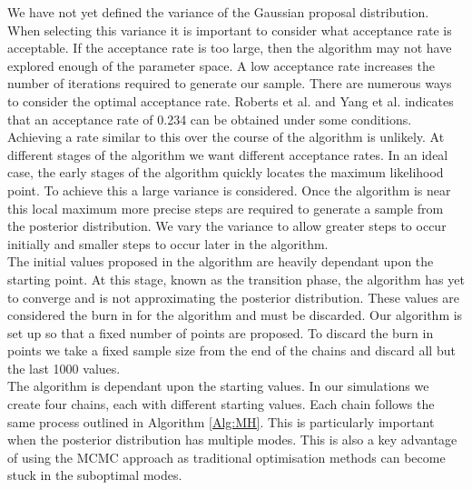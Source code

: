 We have not yet defined the variance of the Gaussian proposal distribution. When selecting this variance it is important to consider what acceptance rate is acceptable. If the acceptance rate is too large, then the algorithm may not have explored enough of the parameter space. A low acceptance rate increases the number of iterations required to generate our sample. There are numerous ways to consider the optimal acceptance rate. Roberts et al. \cite{Rob97} and Yang et al. \cite{Yang20}  indicates that an acceptance rate of 0.234 can be obtained under some conditions. Achieving a rate similar to this over the course of the algorithm is unlikely. At different stages of the algorithm we want different acceptance rates. In an ideal case, the early stages of the algorithm quickly locates the maximum likelihood point. To achieve this a large variance is considered. Once the algorithm is near this local maximum more precise steps are required to generate a sample from the posterior distribution. We vary the variance to allow greater steps to occur initially and smaller steps to occur later in the algorithm.\\
The initial values proposed in the algorithm are heavily dependant upon the starting point. At this stage, known as the transition phase, the algorithm has yet to converge and is not approximating the posterior distribution. These values are considered the burn in for the algorithm and must be discarded. Our algorithm is set up so that a fixed number of points are proposed. To discard the burn in points we take a fixed sample size from the end of the chains and discard all but the last 1000 values.\\
The algorithm is dependant upon the starting values. In our simulations we create four chains, each with different starting values. Each chain follows the same process outlined in Algorithm \ref{Alg:MH}. This is particularly important when the posterior distribution has multiple modes. This is also a key advantage of using the MCMC approach as traditional optimisation methods can become stuck in the suboptimal modes. %


